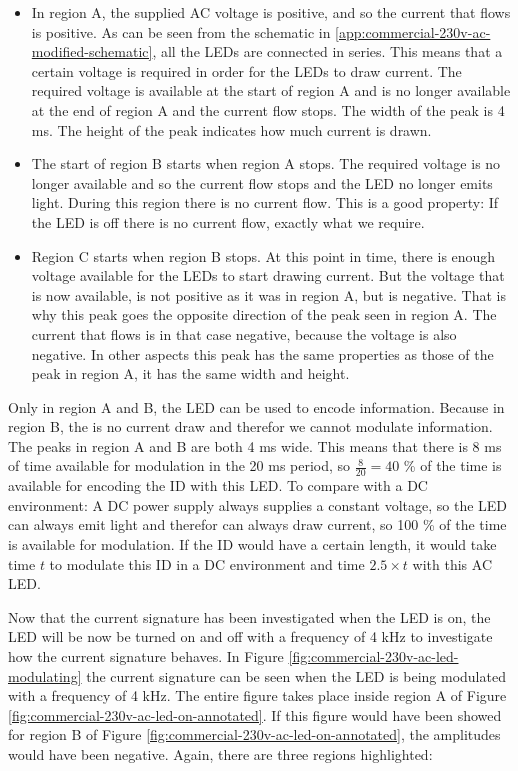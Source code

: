 \begin{itemize}
	\item In region A, the supplied AC voltage is positive, and so the current that flows is positive.
	As can be seen from the schematic in \autoref{app:commercial-230v-ac-modified-schematic}, all the LEDs are connected in series.
	This means that a certain voltage is required in order for the LEDs to draw current.
	The required voltage is available at the start of region A and is no longer available at the end of region A and the current flow stops.
	The width of the peak is 4 ms.
	The height of the peak indicates how much current is drawn.

	\item The start of region B starts when region A stops.
	The required voltage is no longer available and so the current flow stops and the LED no longer emits light.
	During this region there is no current flow.
	This is a good property: If the LED is off there is no current flow, exactly what we require.

	\item Region C starts when region B stops.
	At this point in time, there is enough voltage available for the LEDs to start drawing current.
	But the voltage that is now available, is not positive as it was in region A, but is negative.
	That is why this peak goes the opposite direction of the peak seen in region A.
	The current that flows is in that case negative, because the voltage is also negative.
	In other aspects this peak has the same properties as those of the peak in region A, it has the same width and height.

\end{itemize}


Only in region A and B, the LED can be used to encode information.
Because in region B, the is no current draw and therefor we cannot modulate information.
The peaks in region A and B are both 4 ms wide.
This means that there is 8 ms of time available for modulation in the 20 ms period, so $\frac{8}{20} = 40$ \% of the time is available for encoding the ID with this LED.
To compare with a DC environment: A DC power supply always supplies a constant voltage, so the LED can always emit light and therefor can always draw current, so 100 \% of the time is available for modulation.
If the ID would have a certain length, it would take time $t$ to modulate this ID in a DC environment and time $2.5 \times t$ with this AC LED. 


Now that the current signature has been investigated when the LED is on, the LED will be now be turned on and off with a frequency of 4 kHz to investigate how the current signature behaves.
In Figure \ref{fig:commercial-230v-ac-led-modulating} the current signature can be seen when the LED is being modulated with a frequency of 4 kHz.
The entire figure takes place inside region A of Figure \ref{fig:commercial-230v-ac-led-on-annotated}.
If this figure would have been showed for region B of Figure \ref{fig:commercial-230v-ac-led-on-annotated}, the amplitudes would have been negative.
Again, there are three regions highlighted:

